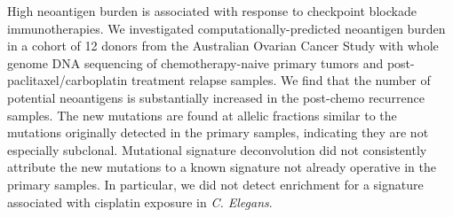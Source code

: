 High neoantigen burden is associated with response to checkpoint blockade immunotherapies. We investigated computationally-predicted neoantigen burden in a cohort of 12 donors from the Australian Ovarian Cancer Study with whole genome DNA sequencing of chemotherapy-naive primary tumors and post-paclitaxel/carboplatin treatment relapse samples. We find that the number of potential neoantigens is substantially increased in the post-chemo recurrence samples. The new mutations are found at allelic fractions similar to the mutations originally detected in the primary samples, indicating they are not especially subclonal. Mutational signature deconvolution did not consistently attribute the new mutations to a known signature not already operative in the primary samples. In particular, we did not detect enrichment for a signature associated with cisplatin exposure in \textit{C. Elegans}.

